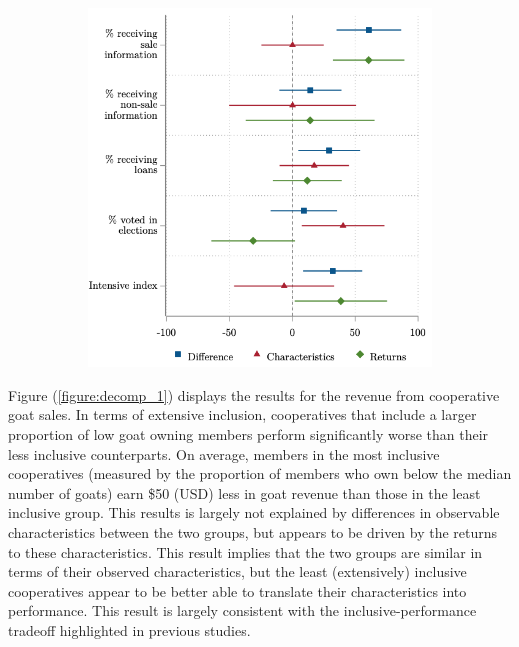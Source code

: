 \documentclass[11pt]{article}
\begin{document}
\begin{figure}[H]
\begin{subfigure}[t]{0.47\textwidth}
        \includegraphics[width=\linewidth,trim=4 4 4 4,clip]{decomp_1_in.png} 
    \end{subfigure}
\end{figure}

Figure (\ref{figure:decomp_1}) displays the results for the revenue from cooperative goat sales. In terms of extensive inclusion, cooperatives that include a larger proportion of low goat owning members perform significantly worse than their less inclusive counterparts. On average, members in the most inclusive cooperatives (measured by the proportion of members who own below the median number of goats) earn \$50 (USD) less in goat revenue than those in the least inclusive group. This results is largely not explained by differences in observable characteristics between the two groups, but appears to be driven by the returns to these characteristics. This result implies that the two groups are similar in terms of their observed characteristics, but the least (extensively) inclusive cooperatives appear to be better able to translate their characteristics into performance. This result is largely consistent with the inclusive-performance tradeoff highlighted in previous studies. 
\end{document}
